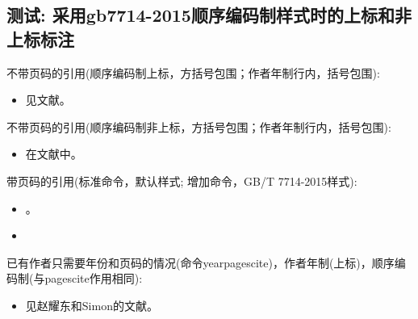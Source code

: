 \subsection{测试: 采用gb7714-2015顺序编码制样式时的上标和非上标标注}\label{sec:cite:cmd:test}
\begin{refsection}
不带页码的引用(顺序编码制上标，方括号包围；作者年制行内，括号包围):
\begin{itemize}
  \item 见文献\cite{Peebles2001-100-100}。
\end{itemize}

不带页码的引用(顺序编码制非上标，方括号包围；作者年制行内，括号包围):
\begin{itemize}
  \item 在文献\parencite{Miroslav2004--}中。
\end{itemize}

带页码的引用(标准命令，默认样式; 增加命令，GB/T 7714-2015样式):
\begin{itemize}
  \item \cite[见][49页]{蔡敏2006--}\parencite[见][49页]{Miroslav2004--}。
  \item {}
\end{itemize}

已有作者只需要年份和页码的情况(命令yearpagescite)，作者年制(上标)，顺序编码制(与pagescite作用相同):
\begin{itemize}
  \item 见赵耀东和Simon的文献。
\end{itemize}

\printbibliography[heading=bibliography,title=【gb7714-2015顺序编码制上标和非上标标注测试】]
\end{refsection}


